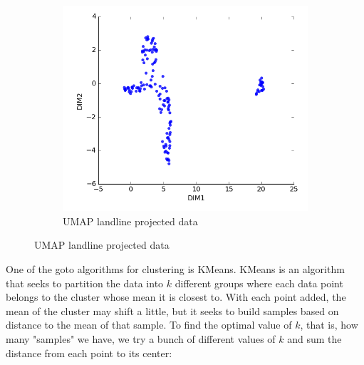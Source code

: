 \documentclass[20pt]{article} %
\begin{document}
\begin{figure}[!htbp]
\begin{subfigure}[p]{0.4\linewidth}
    	\includegraphics[width=\linewidth]{../figures/redo/landlinemap.png}
	\caption{UMAP landline projected data}
   	\end{subfigure}
\end{figure} 

One of the goto algorithms for clustering is KMeans. KMeans is an algorithm that seeks to partition the data into $k$ different groups where each data point belongs to the cluster whose mean it is closest to. With each point added, the mean of the cluster may shift a little, but it seeks to build samples based on distance to the mean of that sample.  To find the optimal value of $k$, that is, how many "samples" we have, we try a bunch of different values of $k$ and sum the distance from each point to its center:
\end{document}

